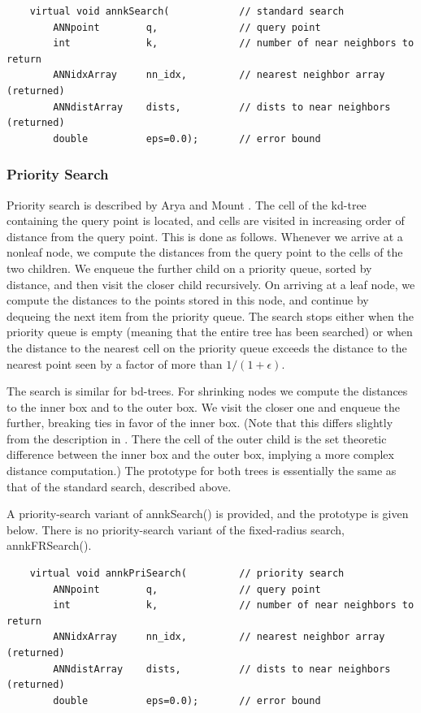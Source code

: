 \documentclass[11pt]{article}		%
\begin{document}
{\small \begin{verbatim}
    virtual void annkSearch(            // standard search
        ANNpoint        q,              // query point
        int             k,              // number of near neighbors to return
        ANNidxArray     nn_idx,         // nearest neighbor array (returned)
        ANNdistArray    dists,          // dists to near neighbors (returned)
        double          eps=0.0);       // error bound
\end{verbatim} }


\subsubsection{Priority Search}\label{prsearch.sec}

Priority search is described by Arya and Mount \cite{ArM93}.  The cell of
the kd-tree containing the query point is located, and cells are visited in
increasing order of distance from the query point.  This is done as follows.
Whenever we arrive at a nonleaf node, we compute the distances from the
query point to the cells of the two children.  We enqueue the further
child on a priority queue, sorted by distance, and then visit the closer
child recursively.  On arriving at a leaf node, we compute the distances
to the points stored in this node, and continue by dequeing the next
item from the priority queue.  The search stops either when the priority
queue is empty (meaning that the entire tree has been searched) or when the
distance to the nearest cell on the priority queue exceeds the distance to
the nearest point seen by a factor of more than $1/(1+\epsilon)$.

The search is similar for bd-trees.  For shrinking nodes we compute the
distances to the inner box and to the outer box.  We visit the closer one
and enqueue the further, breaking ties in favor of the inner box.  (Note
that this differs slightly from the description in \cite{AMN98}.  There
the cell of the outer child is the set theoretic difference between the
inner box and the outer box, implying a more complex distance computation.)
The prototype for both trees is essentially the same as that of the standard
search, described above.

A priority-search variant of \textsf{annkSearch()} is provided, and the
prototype is given below.  There is no priority-search variant of
the fixed-radius search, \textsf{annkFRSearch()}.

{\small \begin{verbatim}
    virtual void annkPriSearch(         // priority search
        ANNpoint        q,              // query point
        int             k,              // number of near neighbors to return
        ANNidxArray     nn_idx,         // nearest neighbor array (returned)
        ANNdistArray    dists,          // dists to near neighbors (returned)
        double          eps=0.0);       // error bound
\end{verbatim} }
\end{document}
